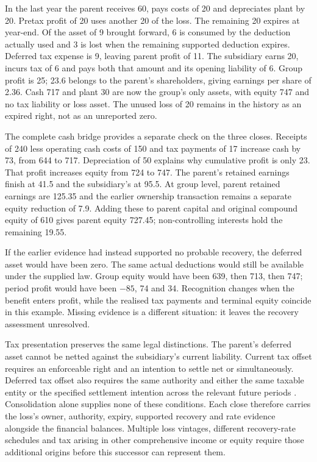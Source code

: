 In the last year the parent receives 60, pays costs of 20 and depreciates
plant by 20. Pretax profit of 20 uses another 20 of the loss. The remaining
20 expires at year-end. Of the asset of 9 brought forward, 6 is consumed by
the deduction actually used and 3 is lost when the remaining supported
deduction expires. Deferred tax expense is 9, leaving parent profit of 11.
The subsidiary earns 20, incurs tax of 6 and pays both that amount and its
opening liability of 6. Group profit is 25; 23.6 belongs to the parent's
shareholders, giving earnings per share of 2.36. Cash 717 and plant 30 are
now the group's only assets, with equity 747 and no tax liability or loss
asset. The unused loss of 20 remains in the history as an expired right,
not as an unreported zero.

The complete cash bridge provides a separate check on the three closes.
Receipts of 240 less operating cash costs of 150 and tax payments of 17
increase cash by 73, from 644 to 717. Depreciation of 50 explains why
cumulative profit is only 23. That profit increases equity from 724 to 747.
The parent's retained earnings finish at 41.5 and the subsidiary's at 95.5.
At group level, parent retained earnings are 125.35 and the earlier ownership
transaction remains a separate equity reduction of 7.9. Adding these to
parent capital and original compound equity of 610 gives parent equity
727.45; non-controlling interests hold the remaining 19.55.

If the earlier evidence had instead supported no probable recovery, the
deferred asset would have been zero. The same actual deductions would still
be available under the supplied law. Group equity would have been 639,
then 713, then 747; period profit would have been \(-85\), 74 and 34.
Recognition changes when the benefit enters profit, while the realised
tax payments and terminal equity coincide in this example. Missing evidence
is a different situation: it leaves the recovery assessment unresolved.

Tax presentation preserves the same legal distinctions. The parent's deferred
asset cannot be netted against the subsidiary's current liability. Current
tax offset requires an enforceable right and an intention to settle net or
simultaneously. Deferred tax offset also requires the same authority and
either the same taxable entity or the specified settlement intention across
the relevant future periods \citep[IAS~12.71--76]{eu20231803}. Consolidation
alone supplies none of these conditions. Each close therefore carries the
loss's owner, authority, expiry, supported recovery and rate evidence alongside
the financial balances. Multiple loss vintages, different recovery-rate
schedules and tax arising in other comprehensive income or equity require
those additional origins before this successor can represent them.
